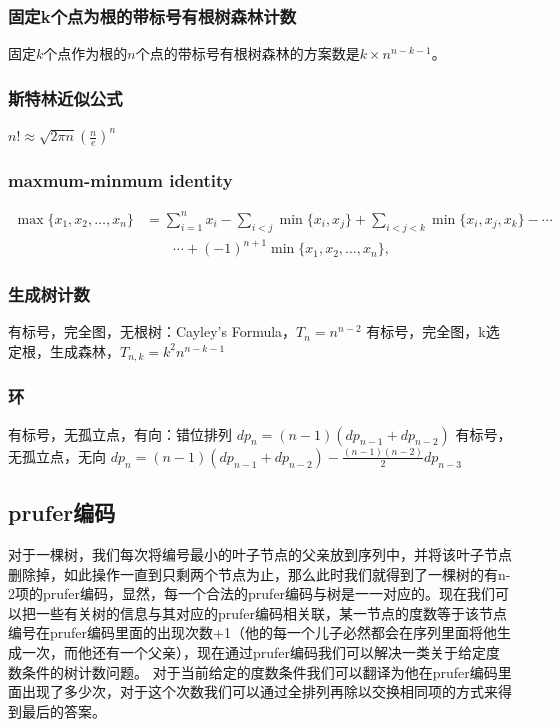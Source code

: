 \documentclass[UTF8,a4paper,titlepage]{ctexart}
\begin{document}
\subsubsection*{固定k个点为根的带标号有根树森林计数}
固定$k$个点作为根的$n$个点的带标号有根树森林的方案数是$k\times n^{n-k-1}$。
\subsubsection*{斯特林近似公式}
$n!\approx\sqrt{2\pi n}(\frac{n}{e})^n$

\subsubsection*{maxmum-minmum identity}
\begin{equation}
	\begin{aligned}
		\max\{x_{1},x_{2},\ldots ,x_{{n}}\} & =\sum _{{i=1}}^{n}x_{i}-\sum _{{i<j}}\min\{x_{i},x_{j}\}+\sum _{{i<j<k}}\min\{x_{i},x_{j},x_{k}\}-\cdots \\&\qquad \cdots +\left(-1\right)^{{n+1}}\min\{x_{1},x_{2},\ldots ,x_{n}\},
	\end{aligned}
\end{equation}
\subsubsection*{生成树计数}
有标号，完全图，无根树：Cayley's Formula，$T_n=n^{n-2}$
有标号，完全图，k选定根，生成森林，$T_{n,k}=k^2n^{n-k-1}$
\subsubsection*{环}
有标号，无孤立点，有向：错位排列 $dp_{n}=(n-1)(dp_{n-1}+dp_{n-2})$
有标号，无孤立点，无向	$dp_{n}=(n-1)(dp_{n-1}+dp_{n-2})-\frac{(n-1)(n-2)}{2}dp_{n-3}$
\subsection{prufer编码}
对于一棵树，我们每次将编号最小的叶子节点的父亲放到序列中，并将该叶子节点删除掉，如此操作一直到只剩两个节点为止，那么此时我们就得到了一棵树的有n-2项的prufer编码，显然，每一个合法的prufer编码与树是一一对应的。现在我们可以把一些有关树的信息与其对应的prufer编码相关联，某一节点的度数等于该节点编号在prufer编码里面的出现次数+1（他的每一个儿子必然都会在序列里面将他生成一次，而他还有一个父亲），现在通过prufer编码我们可以解决一类关于给定度数条件的树计数问题。
对于当前给定的度数条件我们可以翻译为他在prufer编码里面出现了多少次，对于这个次数我们可以通过全排列再除以交换相同项的方式来得到最后的答案。
\end{document}
